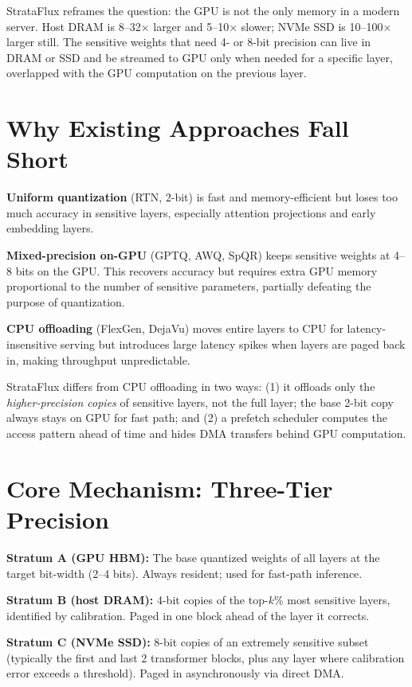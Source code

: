 \documentclass[10pt,twocolumn]{article}
\begin{document}
StrataFlux reframes the question: the GPU is not the only memory in a
modern server. Host DRAM is 8--32$\times$ larger and 5--10$\times$
slower; NVMe SSD is 10--100$\times$ larger still. The sensitive weights
that need 4- or 8-bit precision can live in DRAM or SSD and be streamed
to GPU only when needed for a specific layer, overlapped with the GPU
computation on the previous layer.

\section{Why Existing Approaches Fall Short}

\textbf{Uniform quantization} (RTN, 2-bit) is fast and memory-efficient
but loses too much accuracy in sensitive layers, especially attention
projections and early embedding layers.

\textbf{Mixed-precision on-GPU} (GPTQ, AWQ, SpQR) keeps sensitive
weights at 4--8 bits on the GPU. This recovers accuracy but requires
extra GPU memory proportional to the number of sensitive parameters,
partially defeating the purpose of quantization.

\textbf{CPU offloading} (FlexGen, DejaVu) moves entire layers to CPU
for latency-insensitive serving but introduces large latency spikes when
layers are paged back in, making throughput unpredictable.

StrataFlux differs from CPU offloading in two ways: (1) it offloads
only the \emph{higher-precision copies} of sensitive layers, not the
full layer; the base 2-bit copy always stays on GPU for fast path; and
(2) a prefetch scheduler computes the access pattern ahead of time and
hides DMA transfers behind GPU computation.

\section{Core Mechanism: Three-Tier Precision}

\textbf{Stratum A (GPU HBM):} The base quantized weights of all layers
at the target bit-width (2--4 bits). Always resident; used for fast-path
inference.

\textbf{Stratum B (host DRAM):} 4-bit copies of the top-$k$\% most
sensitive layers, identified by calibration. Paged in one block ahead
of the layer it corrects.

\textbf{Stratum C (NVMe SSD):} 8-bit copies of an extremely sensitive
subset (typically the first and last 2 transformer blocks, plus any
layer where calibration error exceeds a threshold). Paged in
asynchronously via direct DMA.
\end{document}
